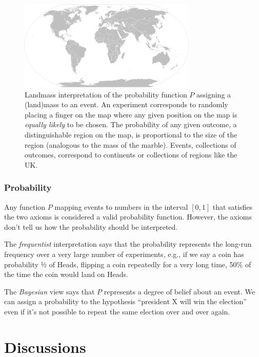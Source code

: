 \documentclass[11pt,a4paper]{article}
\begin{document}
\begin{figure}[h!]
\centering
\includegraphics[width=0.75\linewidth]{images/figure2.png}
\caption{%
Landmass interpretation of the probability function \(P\) assigning a (land)mass to an event.
An experiment corresponds to randomly placing a finger on the map where any given position 
on the map is \emph{equally likely} to be chosen. 
The probability of any given outcome, 
a distinguishable region on the map,
is proportional to the size of the region (analogous to the mass of the marble). 
Events, 
collections of outcomes, 
correspond to continents or collections of regions like the UK.
}
\label{fig:landmass}
\end{figure}

\subsubsection{Probability}

Any function \(P\) mapping events to numbers in the interval \([0,1]\) that satisfies the two axioms 
is considered a valid probability function. 
However, 
the axioms don't tell us how the probability should be interpreted.

The \emph{frequentist} interpretation says that the probability
represents the long-run frequency over a very large number of experiments, 
e.g., if we say a coin has probability ½ of Heads, 
flipping a coin repeatedly for a very long time, 
50\% of the time the coin would land on Heads.%

The \emph{Bayesian} view says that \(P\) represents a degree of belief about an event. 
We can assign a probability to the 
hypothesis ``president X will win the election'' even if it's not 
possible to repeat the same election over and over again.

\section{Discussions}
\end{document}
